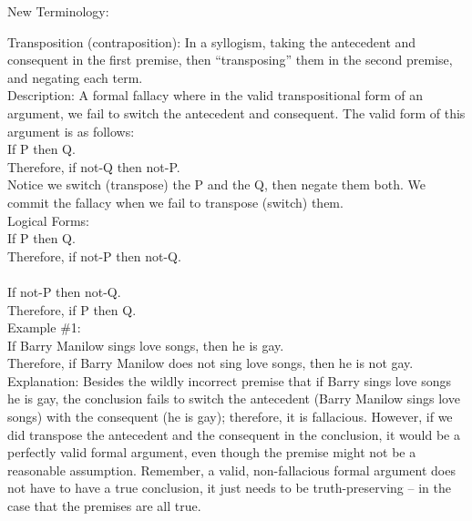 \documentclass[a4paper,12pt,single,pdftex]{scrartcl}
\begin{document}
  
    New Terminology:

    
      Transposition (contraposition): In a syllogism, taking the antecedent and consequent in the first premise, then “transposing” them in the second premise, and negating each term.
    \\

    
      Description: A formal fallacy where in the valid transpositional form of an argument, we fail to switch the antecedent and consequent.  The valid form of this argument is as follows:
    \\

    
      If P then Q.
    \\

    
      Therefore, if not-Q then not-P.
    \\

    
      Notice we switch (transpose) the P and the Q, then negate them both.  We commit the fallacy when we fail to transpose (switch) them.
    \\

    
      Logical Forms:
    \\

    
      If P then Q.
    \\

    
      Therefore, if not-P then not-Q.
    \\

    
       
    \\

    
      If not-P then not-Q.
    \\

    
      Therefore, if P then Q.
    \\

    
      Example \#1:
    \\

    
      If Barry Manilow sings love songs, then he is gay.
    \\

    
      Therefore, if Barry Manilow does not sing love songs, then he is not gay.
    \\

    
      Explanation: Besides the wildly incorrect premise that if Barry sings love songs he is gay, the conclusion fails to switch the antecedent (Barry Manilow sings love songs) with the consequent (he is gay); therefore, it is fallacious.  However, if we did transpose the antecedent and the consequent in the conclusion, it would be a perfectly valid formal argument, even though the premise might not be a reasonable assumption.  Remember, a valid, non-fallacious formal argument does not have to have a true conclusion, it just needs to be truth-preserving -- in the case that the premises are all true.
    \\
\end{document}
